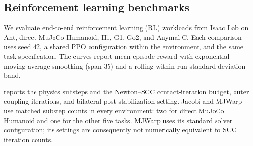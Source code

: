 \documentclass{article}
\theoremstyle{plain}
\theoremstyle{definition}
\begin{document}
\subsection{Reinforcement learning benchmarks}
\label{sec:rl-results}

We evaluate end-to-end reinforcement learning (RL) workloads from Isaac Lab on
Ant, direct MuJoCo Humanoid, H1, G1, Go2, and Anymal C. Each comparison uses
seed 42, a shared PPO configuration within the environment, and the same task
specification. The curves report mean episode reward with exponential
moving-average smoothing (span 35) and a rolling within-run standard-deviation
band.

 reports the physics substeps and the
Newton--SCC contact-iteration budget, outer coupling iterations, and bilateral
post-stabilization setting. Jacobi and MJWarp use matched substep counts in every
environment: two for direct MuJoCo Humanoid and one for the other five tasks.
MJWarp uses its standard solver configuration; its settings are consequently
not numerically equivalent to SCC iteration counts.


\end{document}

